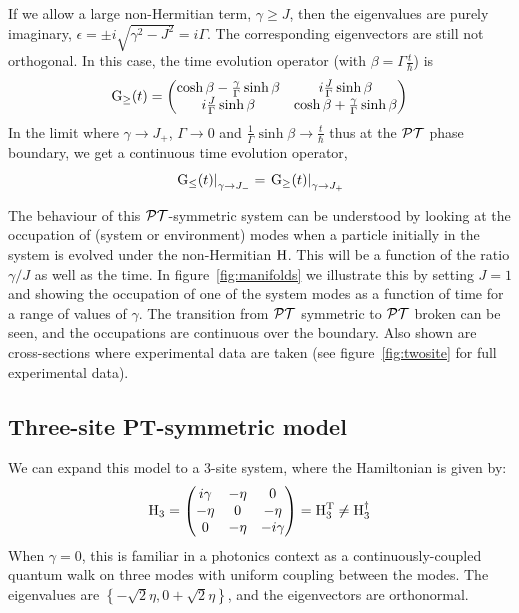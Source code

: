 If we allow a large non-Hermitian term, \( \gamma \geq J \), then the
eigenvalues are purely imaginary, \( \epsilon = \pm i \sqrt{ \gamma^{2} - J^{2}
} = i \Gamma \). The corresponding eigenvectors are still not orthogonal. In
this case, the time evolution operator (with \( \beta = \Gamma \frac{t}{\hbar}
\)) is
\begin{equation}
  \mathrm{G}_{\geq} \!\left(t\right) = \begin{pmatrix}
    \cosh \beta - \frac{\gamma}{\Gamma} \sinh \beta &
    i \frac{J}{\Gamma} \sinh \beta \\
    i \frac{J}{\Gamma} \sinh \beta &
    \cosh \beta + \frac{\gamma}{\Gamma} \sinh \beta
  \end{pmatrix}
\end{equation}
In the limit where \( \gamma \rightarrow J_{+} \), \( \Gamma \rightarrow 0 \)
and \( \frac{1}{\Gamma} \sinh \beta \rightarrow \frac{t}{\hbar} \) thus at the
\(\mathcal{PT}{}\) phase boundary, we get a continuous time evolution operator,
\begin{equation}
  \left. \mathrm{G}_{\leq} \!\left(t\right) \right|_{\gamma \rightarrow J_{-}} = \left.
    \mathrm{G}_{\geq} \!\left(t\right) \right|_{\gamma \rightarrow J_{+}}
\end{equation}

The behaviour of this \(\mathcal{PT}{}\)-symmetric system can be understood by looking at
the occupation of (system or environment) modes when a particle initially in the
system is evolved under the non-Hermitian \(\mathrm{H}\). This will be a function
of the ratio \(\gamma/J\) as well as the time. In figure~\ref{fig:manifolds} we
illustrate this by setting \(J=1\) and showing the occupation of one of the
system modes as a function of time for a range of values of \(\gamma\). The
transition from \(\mathcal{PT}{}\) symmetric to \(\mathcal{PT}{}\) broken can be seen, and the
occupations are continuous over the boundary. Also shown are cross-sections
where experimental data are taken (see figure~\ref{fig:twosite} for full
experimental data).

\subsection{Three-site PT-symmetric model}
\label{sec:ThreeSite}
We can expand this model to a 3-site system, where the Hamiltonian is given by:
\begin{equation}
  \mathrm{H}_{3} = \begin{pmatrix}
    i \gamma & -\eta & 0 \\
    -\eta & 0 & -\eta \\
    0 & -\eta & -i \gamma \\
  \end{pmatrix} = \mathrm{H}_{3}^{\mathrm{T}} \neq \mathrm{H}_{3}^{\dagger}
\end{equation}
When \(\gamma=0\), this is familiar in a photonics context as a
continuously-coupled quantum walk on three modes with uniform coupling between
the modes. The eigenvalues are \(\left\{ -\sqrt{2} \eta, 0 +\sqrt{2}
\eta\right\}\), and the eigenvectors are orthonormal.

